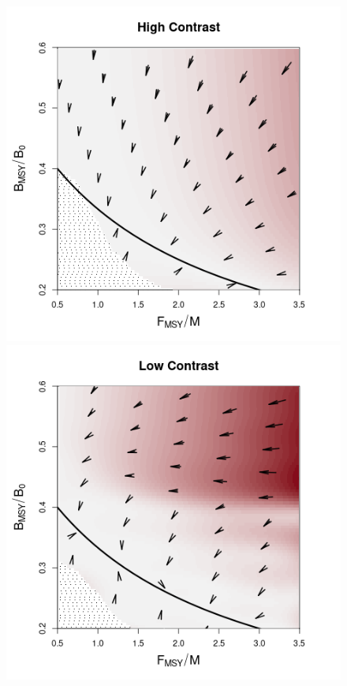 %
\begin{figure}[h!]
\begin{minipage}[h!]{0.44\textwidth}
\includegraphics[width=\textwidth]{../ddBias/directionalBiasDDSubExpT45N300AS0.1K10Reds 2.png}
\end{minipage}
\begin{minipage}[h!]{0.44\textwidth}
\includegraphics[width=\textwidth]{../ddBias/directionalBiasDDSubFlatT45N150A0-1AS0.1K10N56Reds 2.png}

\end{minipage}
\end{figure}

